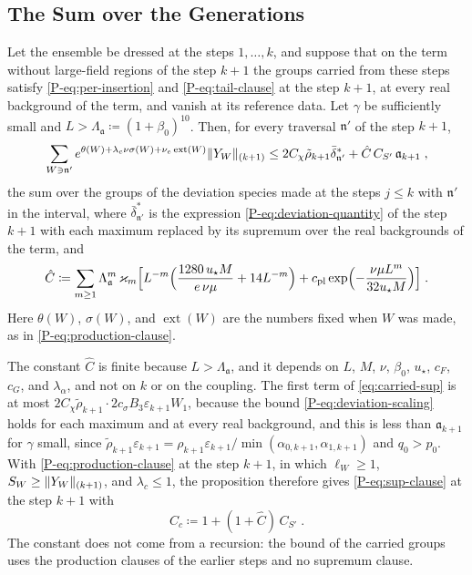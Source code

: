 \subsection{The Sum over the Generations}\label{sec:generation-sum}

\begin{proposition}\label{prop:carried-sup}
Let the ensemble be dressed at the steps $1, \dots, k$, and suppose that on the term without large-field regions of the step $k + 1$ the groups carried from these steps satisfy \eqref{P-eq:per-insertion} and \eqref{P-eq:tail-clause} at the step $k + 1$, at every real background of the term, and vanish at its reference data. Let $\gamma$ be sufficiently small and $L > \Lambda_{\mathfrak a} \coloneqq (1 + \beta_0)^{10}$. Then, for every traversal $\mathfrak n'$ of the step $k + 1$,
\begin{equation}\label{eq:carried-sup}
    \sum_{W \ni \mathfrak n'}e^{\theta(W) + \lambda_c\nu\sigma(W) + \nu_e\operatorname{ext}(W)}\lVert Y_W\rVert_{(k+1)} \leq 2C_\chi\tilde\rho_{k+1}\bar\delta^*_{\mathfrak n'} + \hat C\,C_{S'}\,\mathfrak a_{k+1}\;,
\end{equation}
the sum over the groups of the deviation species made at the steps $j \leq k$ with $\mathfrak n'$ in the interval, where $\bar\delta^*_{\mathfrak n'}$ is the expression \eqref{P-eq:deviation-quantity} of the step $k + 1$ with each maximum replaced by its supremum over the real backgrounds of the term, and
\begin{equation}\label{eq:generation-constant}
    \hat C \coloneqq \sum_{m \geq 1}\Lambda_{\mathfrak a}^m\,\varkappa_m\Bigl[L^{-m}\Bigl(\frac{1280\,u_\star M}{e\,\nu\mu} + 14L^{-m}\Bigr) + c_{\mathrm{pl}}\exp\Bigl(-\frac{\nu\mu L^m}{32u_\star M}\Bigr)\Bigr]\;.
\end{equation}
Here $\theta(W)$, $\sigma(W)$, and $\operatorname{ext}(W)$ are the numbers fixed when $W$ was made, as in \eqref{P-eq:production-clause}.
\end{proposition}

The constant $\hat C$ is finite because $L > \Lambda_{\mathfrak a}$, and it depends on $L$, $M$, $\nu$, $\beta_0$, $u_\star$, $c_F$, $c_G$, and $\lambda_\alpha$, and not on $k$ or on the coupling. The first term of \eqref{eq:carried-sup} is at most $2C_\chi\tilde\rho_{k+1} \cdot 2c_\sigma B_3\varepsilon_{k+1}W_1$, because the bound \eqref{P-eq:deviation-scaling} holds for each maximum and at every real background, and this is less than $\mathfrak a_{k+1}$ for $\gamma$ small, since $\tilde\rho_{k+1}\varepsilon_{k+1} = \rho_{k+1}\varepsilon_{k+1}/\min(\alpha_{0,k+1}, \alpha_{1,k+1})$ and $q_0 > p_0$. With \eqref{P-eq:production-clause} at the step $k + 1$, in which $\ell_W \geq 1$, $S_W \geq \lVert Y_W\rVert_{(k+1)}$, and $\lambda_c \leq 1$, the proposition therefore gives \eqref{P-eq:sup-clause} at the step $k + 1$ with
\begin{equation}\label{eq:sup-constant}
    C_c \coloneqq 1 + (1 + \hat C)\,C_{S'}\;.
\end{equation}
The constant does not come from a recursion: the bound of the carried groups uses the production clauses of the earlier steps and no supremum clause.

